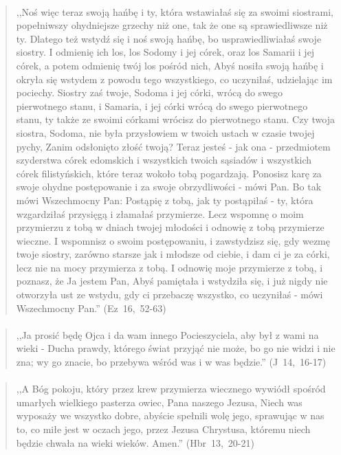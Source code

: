 \documentclass[10pt,a4paper,oneside]{article}
\begin{document}
\paragraph{}
\begin{quote}
,,Noś więc teraz swoją hańbę i ty, która wstawiałaś się za swoimi siostrami, popełniwszy ohydniejsze grzechy niż one, tak że one są sprawiedliwsze niż ty. Dlatego też wstydź się i noś swoją hańbę, bo usprawiedliwiałaś swoje siostry. I odmienię ich los, los Sodomy i jej córek, oraz los Samarii i jej córek, a potem odmienię twój los pośród nich, Abyś nosiła swoją hańbę i okryła się wstydem z powodu tego wszystkiego, co uczyniłaś, udzielając im pociechy. Siostry zaś twoje, Sodoma i jej córki, wrócą do swego pierwotnego stanu, i Samaria, i jej córki wrócą do swego pierwotnego stanu, ty także ze swoimi córkami wrócisz do pierwotnego stanu. Czy twoja siostra, Sodoma, nie była przysłowiem w twoich ustach w czasie twojej pychy, Zanim odsłonięto złość twoją? Teraz jesteś - jak ona - przedmiotem szyderstwa córek edomskich i wszystkich twoich sąsiadów i wszystkich córek filistyńskich, które teraz wokoło tobą pogardzają. Ponosisz karę za swoje ohydne postępowanie i za swoje obrzydliwości - mówi Pan. Bo tak mówi Wszechmocny Pan: Postąpię z tobą, jak ty postąpiłaś - ty, która wzgardziłaś przysięgą i złamałaś przymierze. Lecz wspomnę o moim przymierzu z tobą w dniach twojej młodości i odnowię z tobą przymierze wieczne. I wspomnisz o swoim postępowaniu, i zawstydzisz się, gdy wezmę twoje siostry, zarówno starsze jak i młodsze od ciebie, i dam ci je za córki, lecz nie na mocy przymierza z tobą. I odnowię moje przymierze z tobą, i poznasz, że Ja jestem Pan, Abyś pamiętała i wstydziła się, i już nigdy nie otworzyła ust ze wstydu, gdy ci przebaczę wszystko, co uczyniłaś - mówi Wszechmocny Pan.'' \mbox{(Ez 16, 52-63)}
\end{quote}
\paragraph{}
\begin{quote}
,,Ja prosić będę Ojca i da wam innego Pocieszyciela, aby był z wami na wieki - Ducha prawdy, którego świat przyjąć nie może, bo go nie widzi i nie zna; wy go znacie, bo przebywa wśród was i w was będzie.'' \mbox{(J 14, 16-17)}
\end{quote}
\paragraph{}
\begin{quote}
,,A Bóg pokoju, który przez krew przymierza wiecznego wywiódł spośród umarłych wielkiego pasterza owiec, Pana naszego Jezusa, Niech was wyposaży we wszystko dobre, abyście spełnili wolę jego, sprawując w nas to, co miłe jest w oczach jego, przez Jezusa Chrystusa, któremu niech będzie chwała na wieki wieków. Amen.'' \mbox{(Hbr 13, 20-21)}
\end{quote}
\end{document}
